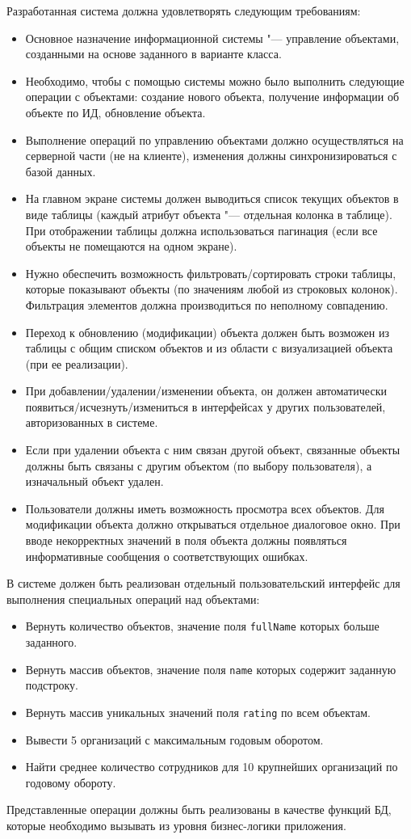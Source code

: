\documentclass[12pt,a4paper]{article}
\begin{document}
Разработанная система должна удовлетворять следующим требованиям:
\begin{itemize}
    \item Основное назначение информационной системы "--- управление объектами, созданными на основе заданного в варианте класса.
    \item Необходимо, чтобы с помощью системы можно было выполнить следующие операции с объектами: создание нового объекта, получение информации об объекте по ИД, обновление объекта.
    \item Выполнение операций по управлению объектами должно осуществляться на серверной части (не на клиенте), изменения должны синхронизироваться с базой данных.
    \item На главном экране системы должен выводиться список текущих объектов в виде таблицы (каждый атрибут объекта "--- отдельная колонка в таблице). При отображении таблицы должна использоваться пагинация (если все объекты не помещаются на одном экране).
    \item Нужно обеспечить возможность фильтровать/сортировать строки таблицы, которые показывают объекты (по значениям любой из строковых колонок). Фильтрация элементов должна производиться по неполному совпадению.
    \item Переход к обновлению (модификации) объекта должен быть возможен из таблицы с общим списком объектов и из области с визуализацией объекта (при ее реализации).
    \item При добавлении/удалении/изменении объекта, он должен автоматически появиться/\allowbreak исчезнуть/\allowbreak измениться в интерфейсах у других пользователей, авторизованных в системе.
    \item Если при удалении объекта с ним связан другой объект, связанные объекты должны быть связаны с другим объектом (по выбору пользователя), а изначальный объект удален.
    \item Пользователи должны иметь возможность просмотра всех объектов. Для модификации объекта должно открываться отдельное диалоговое окно. При вводе некорректных значений в поля объекта должны появляться информативные сообщения о соответствующих ошибках.
\end{itemize}

В системе должен быть реализован отдельный пользовательский интерфейс для выполнения специальных операций над объектами:
\begin{itemize}
    \item Вернуть количество объектов, значение поля \texttt{fullName} которых больше заданного.
    \item Вернуть массив объектов, значение поля \texttt{name} которых содержит заданную подстроку.
    \item Вернуть массив уникальных значений поля \texttt{rating} по всем объектам.
    \item Вывести 5 организаций с максимальным годовым оборотом.
    \item Найти среднее количество сотрудников для 10 крупнейших организаций по годовому обороту.
\end{itemize}
Представленные операции должны быть реализованы в качестве функций БД, которые необходимо вызывать из уровня бизнес-логики приложения.
\end{document}
